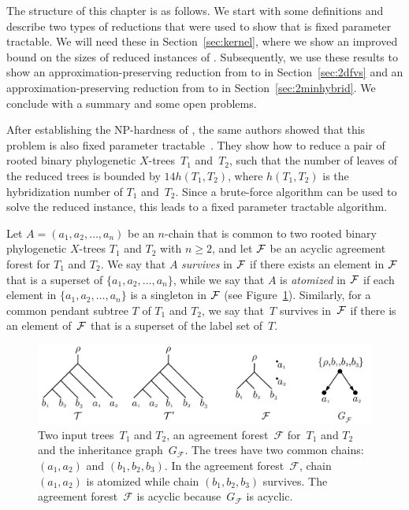 The structure of this chapter is as follows. We start with some definitions and describe two types of reductions that were used to show that \mh is fixed parameter tractable. We will need these in Section~\ref{sec:kernel}, where we show an improved bound on the sizes of reduced instances of \mh. Subsequently, we use these results to show an approximation-preserving reduction from \mh to \dfvs in Section~\ref{sec:2dfvs} and an approximation-preserving reduction from \dfvs to \mh in Section~\ref{sec:2minhybrid}. We conclude with a summary and some open problems.





After establishing the NP-hardness of \mh, the same authors showed that this problem is also fixed parameter tractable~\cite{bordewich07b}. They show how to reduce a pair of rooted binary phylogenetic $X$-trees~$T_1$ and~$T_2$, such that the number of leaves of the reduced trees is bounded by $14h(T_1,T_2)$, where $h(T_1,T_2)$ is the hybridization number of $T_1$ and~$T_2$. Since a brute-force algorithm can be used to solve the reduced instance, this leads to a fixed parameter tractable algorithm.

Let $A=(a_1,a_2,\ldots,a_n)$ be an $n$-chain that is common to two rooted binary phylogenetic $X$-trees $T_1$ and $T_2$ {with $n\geq 2$}, and let ${\mathcal F}$ be an acyclic agreement forest for $T_1$ and $T_2$. We say that $A$ {\it survives} in ${\mathcal F}$ if there exists an element in ${\mathcal F}$ that is a superset of $\{a_1,a_2,\ldots,a_n\}$, while we say that $A$ is {\it atomized} in ${\mathcal F}$ if each element in $\{a_1,a_2,\ldots,a_n\}$ is a singleton in ${\mathcal F}$ (see Figure~\ref{fig:chains}). {Similarly, for a common pendant subtree $T$ of $T_1$ and $T_2$, we say that~$T$ survives in~${\mathcal F}$ if there is an element of~${\mathcal F}$ that is a superset of the label set of~$T$.}

\begin{figure}
    \centering
     \includegraphics[scale=.5]{../figs/fig_chains}
    \caption{Two input trees~$T_1$ and $T_2$, an agreement forest~$\mathcal{F}$ for~$T_1$ and $T_2$ and the inheritance graph~$G_\mathcal{F}$. The trees have two common chains: $(a_1,a_2)$ and $(b_1,b_2,b_3)$. In the agreement forest~$\mathcal{F}$, chain $(a_1,a_2)$ is atomized while chain $(b_1,b_2,b_3)$ survives. The agreement forest~$\mathcal{F}$ is acyclic because~$G_\mathcal{F}$ is acyclic.}
    \label{fig:chains}
\end{figure}


